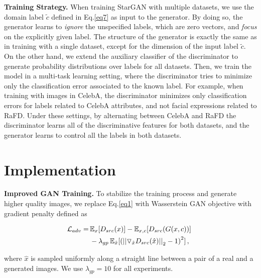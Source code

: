\medskip

\textbf{Training Strategy.} When training StarGAN with multiple datasets, we use the domain label $\tilde{c}$ defined in Eq.\thinspace\eqref{eq7} as input to the generator. By doing so, the generator learns to \textit{ignore} the unspecified labels, which are zero vectors, and \textit{focus} on the explicitly given label. The structure of the generator is exactly the same as in training with a single dataset, except for the dimension of the input label $\tilde{c}$. On the other hand, we extend the auxiliary classifier of the discriminator to generate probability distributions over labels for all datasets. Then, we train the model in a multi-task learning setting, where the discriminator tries to minimize only the classification error associated to the known label. For example, when training with images in CelebA, the discriminator minimizes only classification errors for labels related to CelebA attributes, and not facial expressions related to RaFD. Under these settings, by alternating between CelebA and RaFD the discriminator learns all of the discriminative features for both datasets, and the generator learns to control all the labels in both datasets. 

\section{Implementation} \label{implementation}

 \textbf{Improved GAN Training.} To stabilize the training process and generate higher quality images, we replace Eq.\thinspace\eqref{eq1} with Wasserstein GAN objective with gradient penalty \cite{arjovsky2017wasserstein,gulrajani2017improved} defined as

\begin{equation}
\begin{split}
\mathcal{L}_{adv} = \thinspace & {\mathbb{E}}_{x}[{D}_{src}(x)] - {\mathbb{E}}_{x, c}[{D}_{src}(G(x, c))] \thinspace \thinspace\\  
& - {\lambda}_{gp} \thinspace {\mathbb{E}}_{\hat{x}}[{{(||{\triangledown}_{\hat{x}} {D}_{src}(\hat{x})||}_{2} - 1)}^{2}] \thinspace,
\end{split}
\end{equation}

where $\hat{x}$ is sampled uniformly along a straight line between a pair of a real and a generated images. We use ${\lambda}_{gp} = 10$ for all experiments.

\medskip


